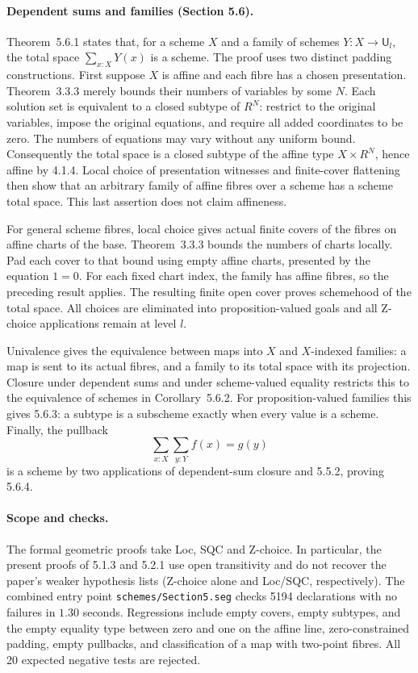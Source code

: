 \documentclass[11pt]{article}
\newcommand{\kw}[1]{\texttt{#1}}
\newcommand{\U}{\mathsf{U}}
\theoremstyle{remark}
\begin{document}
\paragraph{Dependent sums and families (Section 5.6).}
Theorem~5.6.1 states that, for a scheme $X$ and a family of schemes
$Y:X\to\U_l$, the total space $\sum_{x:X}Y(x)$ is a scheme.
The proof uses two distinct padding constructions.
First suppose $X$ is affine and each fibre has a chosen presentation.
Theorem~3.3.3 merely bounds their numbers of variables by some $N$.
Each solution set is equivalent to a closed subtype of $R^N$:
restrict to the original variables, impose the original equations,
and require all added coordinates to be zero. The numbers of equations
may vary without any uniform bound. Consequently the total space is a
closed subtype of the affine type $X\times R^N$, hence affine by 4.1.4.
Local choice of presentation witnesses and finite-cover flattening then
show that an arbitrary family of affine fibres over a scheme has a
scheme total space. This last assertion does not claim affineness.

For general scheme fibres, local choice gives actual finite covers of
the fibres on affine charts of the base. Theorem~3.3.3 bounds the numbers
of charts locally. Pad each cover to that bound using empty affine
charts, presented by the equation $1=0$. For each fixed chart index,
the family has affine fibres, so the preceding result applies.
The resulting finite open cover proves schemehood of the total space.
All choices are eliminated into proposition-valued goals and all
Z-choice applications remain at level $l$.

Univalence gives the equivalence between maps into $X$ and $X$-indexed
families: a map is sent to its actual fibres, and a family to its total
space with its projection. Closure under dependent sums and under
scheme-valued equality restricts this to the equivalence of schemes in
Corollary~5.6.2. For proposition-valued families this gives 5.6.3:
a subtype is a subscheme exactly when every value is a scheme.
Finally, the pullback
\[
             \sum_{x:X}\sum_{y:Y} f(x)=g(y)
\]
is a scheme by two applications of dependent-sum closure and 5.5.2,
proving 5.6.4.

\paragraph{Scope and checks.}
The formal geometric proofs take Loc, SQC and Z-choice.
In particular, the present proofs of 5.1.3 and 5.2.1 use open
transitivity and do not recover the paper's weaker hypothesis lists
(Z-choice alone and Loc/SQC, respectively).
The combined entry point \kw{schemes/Section5.seg} checks
5194 declarations with no failures in $1.30$ seconds.
Regressions include empty covers, empty subtypes, and the empty
equality type between zero and one on the affine line, zero-constrained
padding, empty pullbacks, and classification of a map with two-point
fibres. All 20 expected negative tests are rejected.
\end{document}
